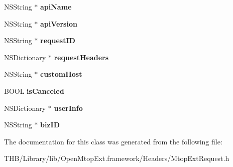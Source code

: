 \begin{DoxyCompactItemize}
N\+S\+String $\ast$ {\bfseries api\+Name}
\item 
\mbox{\label{interface_mtop_ext_request_adbc7476fb313aac2cb64082508ed2f06}} 
N\+S\+String $\ast$ {\bfseries api\+Version}
\item 
\mbox{\label{interface_mtop_ext_request_ae595b6cd59694c2523b65fc089259b67}} 
N\+S\+String $\ast$ {\bfseries request\+ID}
\item 
\mbox{\label{interface_mtop_ext_request_a17440ab3a9c472d1e50346905b494f15}} 
N\+S\+Dictionary $\ast$ {\bfseries request\+Headers}
\item 
\mbox{\label{interface_mtop_ext_request_a3b91197fc1392b3f98c4570dfd59973e}} 
N\+S\+String $\ast$ {\bfseries custom\+Host}
\item 
\mbox{\label{interface_mtop_ext_request_a00c56358b6caeaa3570b115c9758d7f5}} 
B\+O\+OL {\bfseries is\+Canceled}
\item 
\mbox{\label{interface_mtop_ext_request_a26eb651261e4d79de8f37e85647ff576}} 
N\+S\+Dictionary $\ast$ {\bfseries user\+Info}
\item 
\mbox{\label{interface_mtop_ext_request_a572896de95d2fabbb0ce5652d7ebefc7}} 
N\+S\+String $\ast$ {\bfseries biz\+ID}
\end{DoxyCompactItemize}


The documentation for this class was generated from the following file\+:\begin{DoxyCompactItemize}
\item 
T\+H\+B/\+Library/lib/\+Open\+Mtop\+Ext.\+framework/\+Headers/Mtop\+Ext\+Request.\+h\end{DoxyCompactItemize}
